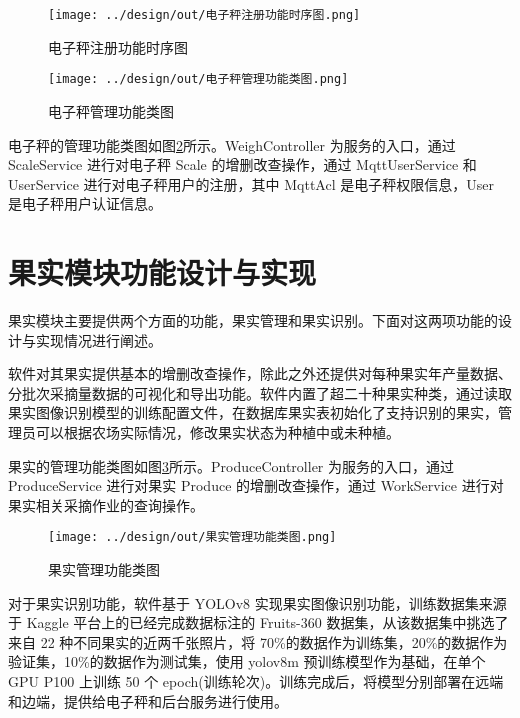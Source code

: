 \begin{figure}
    \centering
    \texttt{[image: ../design/out/电子秤注册功能时序图.png]}
    \caption{电子秤注册功能时序图}
    \label{fig:电子秤注册功能时序图}
\end{figure}

\begin{figure}
    \centering
    \texttt{[image: ../design/out/电子秤管理功能类图.png]}
    \caption{电子秤管理功能类图}
    \label{fig:电子秤管理功能类图}
\end{figure}

电子秤的管理功能类图如图\ref{fig:电子秤管理功能类图}所示。WeighController 为服务的入口，通过 ScaleService 进行对电子秤 Scale 的增删改查操作，通过 MqttUserService 和 UserService 进行对电子秤用户的注册，其中 MqttAcl 是电子秤权限信息，User 是电子秤用户认证信息。

\section{果实模块功能设计与实现}\label{sec:produce-mode}

果实模块主要提供两个方面的功能，果实管理和果实识别。下面对这两项功能的设计与实现情况进行阐述。

软件对其果实提供基本的增删改查操作，除此之外还提供对每种果实年产量数据、分批次采摘量数据的可视化和导出功能。软件内置了超二十种果实种类，通过读取果实图像识别模型的训练配置文件，在数据库果实表初始化了支持识别的果实，管理员可以根据农场实际情况，修改果实状态为种植中或未种植。

果实的管理功能类图如图\ref{fig:果实管理功能类图}所示。ProduceController 为服务的入口，通过 ProduceService 进行对果实 Produce 的增删改查操作，通过 WorkService 进行对果实相关采摘作业的查询操作。

\begin{figure}
    \centering
    \texttt{[image: ../design/out/果实管理功能类图.png]}
    \caption{果实管理功能类图}
    \label{fig:果实管理功能类图}
\end{figure}

对于果实识别功能，软件基于 YOLOv8 实现果实图像识别功能，训练数据集来源于 Kaggle 平台上的已经完成数据标注的 Fruits-360 数据集，从该数据集中挑选了来自 22 种不同果实的近两千张照片，将 70\%的数据作为训练集，20\%的数据作为验证集，10\%的数据作为测试集，使用 yolov8m 预训练模型作为基础，在单个 GPU P100 上训练 50 个 epoch(训练轮次)。训练完成后，将模型分别部署在远端和边端，提供给电子秤和后台服务进行使用。

